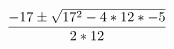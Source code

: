 \documentclass[preview]{standalone}
\begin{document}
\begin{align*}
\special{dvisvgm:raw <g id='unique000'>}\frac{-17 \pm \sqrt{17^2 - 4 * 12 * -5}}{2 * 12}\special{dvisvgm:raw </g>}
\end{align*}
\end{document}
